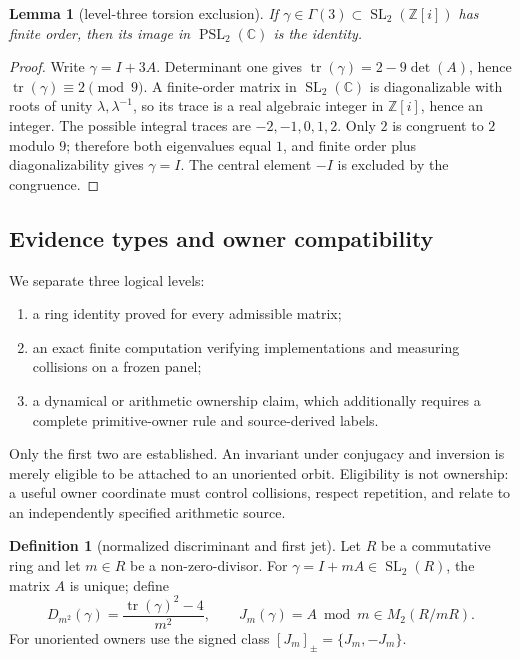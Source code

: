 \documentclass[11pt,a4paper]{article}
\newtheorem{lemma}[theorem]{Lemma}
\theoremstyle{definition}
\newtheorem{definition}[theorem]{Definition}
\theoremstyle{remark}
\newcommand{\SL}{\operatorname{SL}}
\newcommand{\tr}{\operatorname{tr}}
\newcommand{\Gauss}{\mathbb{Z}[i]}
\begin{document}
\begin{lemma}[level-three torsion exclusion]\label{lem:torsion}
If \(\gamma\in\Gamma(3)\subset\SL_2(\Gauss)\) has finite order, then its image in \(\operatorname{PSL}_2(\mathbb C)\) is the identity.
\end{lemma}

\begin{proof}
Write \(\gamma=I+3A\). Determinant one gives \(\tr(\gamma)=2-9\det(A)\), hence \(\tr(\gamma)\equiv2\pmod 9\). A finite-order matrix in \(\SL_2(\mathbb C)\) is diagonalizable with roots of unity \(\lambda,\lambda^{-1}\), so its trace is a real algebraic integer in \(\Gauss\), hence an integer. The possible integral traces are \(-2,-1,0,1,2\). Only \(2\) is congruent to \(2\) modulo \(9\); therefore both eigenvalues equal \(1\), and finite order plus diagonalizability gives \(\gamma=I\). The central element \(-I\) is excluded by the congruence.
\end{proof}

\subsection{Evidence types and owner compatibility}

We separate three logical levels:
\begin{enumerate}[label=(\roman*)]
 \item a ring identity proved for every admissible matrix;
 \item an exact finite computation verifying implementations and measuring collisions on a frozen panel;
 \item a dynamical or arithmetic ownership claim, which additionally requires a complete primitive-owner rule and source-derived labels.
\end{enumerate}
Only the first two are established. An invariant under conjugacy and inversion is merely eligible to be attached to an unoriented orbit. Eligibility is not ownership: a useful owner coordinate must control collisions, respect repetition, and relate to an independently specified arithmetic source.

\begin{definition}[normalized discriminant and first jet]
Let \(R\) be a commutative ring and let \(m\in R\) be a non-zero-divisor.
For \(\gamma=I+mA\in\SL_2(R)\), the matrix \(A\) is unique; define
\[
 D_{m^2}(\gamma)=\frac{\tr(\gamma)^2-4}{m^2},
 \qquad J_m(\gamma)=A\bmod m\in M_2(R/mR).
\]
For unoriented owners use the signed class \([J_m]_{\pm}=\{J_m,-J_m\}\).
\end{definition}
\end{document}
